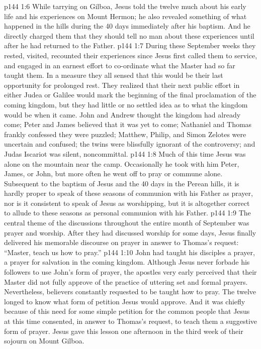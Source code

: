 \vs p144 1:6 \pc While tarrying on Gilboa, Jesus told the twelve much about his early life and his experiences on Mount Hermon; he also revealed something of what happened in the hills during the 40 days immediately after his baptism. And he directly charged them that they should tell no man about these experiences until after he had returned to the Father.
\vs p144 1:7 During these September weeks they rested, visited, recounted their experiences since Jesus first called them to service, and engaged in an earnest effort to co\hyp{}ordinate what the Master had so far taught them. In a measure they all sensed that this would be their last opportunity for prolonged rest. They realized that their next public effort in either Judea or Galilee would mark the beginning of the final proclamation of the coming kingdom, but they had little or no settled idea as to what the kingdom would be when it came. John and Andrew thought the kingdom had already come; Peter and James believed that it was yet to come; Nathaniel and Thomas frankly confessed they were puzzled; Matthew, Philip, and Simon Zelotes were uncertain and confused; the twins were blissfully ignorant of the controversy; and Judas Iscariot was silent, noncommittal.
\vs p144 1:8 \pc Much of this time Jesus was alone on the mountain near the camp. Occasionally he took with him Peter, James, or John, but more often he went off to pray or commune alone. Subsequent to the baptism of Jesus and the 40 days in the Perean hills, it is hardly proper to speak of these seasons of communion with his Father as prayer, nor is it consistent to speak of Jesus as worshipping, but it is altogether correct to allude to these seasons as personal communion with his Father.
\vs p144 1:9 The central theme of the discussions throughout the entire month of September was prayer and worship. After they had discussed worship for some days, Jesus finally delivered his memorable discourse on prayer in answer to Thomas’s request: “Master, teach us how to pray.”
\vs p144 1:10 John had taught his disciples a prayer, a prayer for salvation in the coming kingdom. Although Jesus never forbade his followers to use John’s form of prayer, the apostles very early perceived that their Master did not fully approve of the practice of uttering set and formal prayers. Nevertheless, believers constantly requested to be taught how to pray. The twelve longed to know what form of petition Jesus would approve. And it was chiefly because of this need for some simple petition for the common people that Jesus at this time consented, in answer to Thomas’s request, to teach them a suggestive form of prayer. Jesus gave this lesson one afternoon in the third week of their sojourn on Mount Gilboa.
